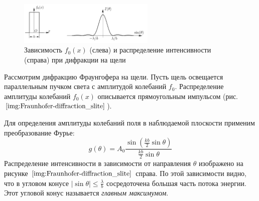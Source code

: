 \begin{figure}
	\centering
	\includegraphics[width=0.58\textwidth]{../Изображения/Дифракция Фраунгофера на щели.png}
	\caption{Зависимость $f_0(x)$ (слева) и распределение интенсивности (справа) при дифракции на щели}
	\label{img:Fraunhofer-diffraction_slite}
\end{figure}

Рассмотрим дифракцию Фраунгофера на щели. Пусть щель освещается параллельным пучком света с амплитудой колебаний $f_0$. Распределение амплитуды колебаний $f_0(x)$ описывается прямоугольным импульсом (рис. $\ref{img:Fraunhofer-diffraction_slite}$).

Для определения амплитуды колебаний поля в наблюдаемой плоскости применим преобразование Фурье:
$$
g(\theta) = A_0 \frac{\sin \left( \frac{kb}{2} \sin \theta \right)}{\frac{kb}{2} \sin \theta}
$$
Распределение интенсивности в зависимости от направления $\theta$ изображено на рисунке $\ref{img:Fraunhofer-diffraction_slite}$ справа. По этой зависимости видно, что в угловом конусе $|\sin \theta| \le \frac{\lambda}{b}$ сосредоточена большая часть потока энергии. Этот угловой конус называется \textit{главным максимумом}.